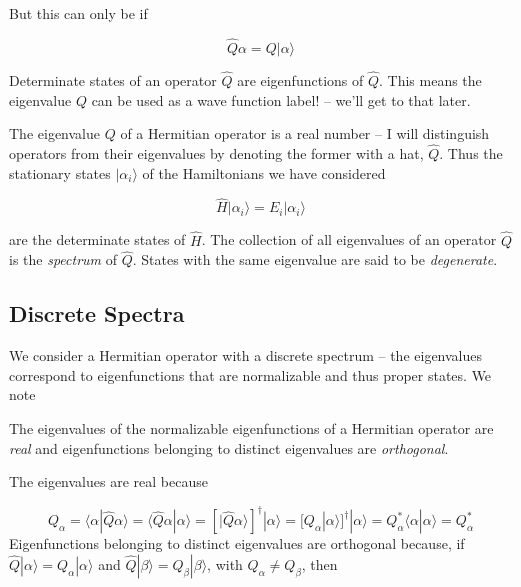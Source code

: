 But this can only be if 

\begin{mainbox}{}
  \[
  \hat{Q} \alpha = Q |\alpha\rangle
  \] \vspace{3px}
  
  Determinate states of an operator $\hat{Q}$ are eigenfunctions of $\hat{Q}$.
  This means the eigenvalue $Q$  can be used as a wave function label! -- we'll
  get to that later. 
\end{mainbox}

The eigenvalue $Q$ of a Hermitian operator is a real number -- I will
distinguish operators from their eigenvalues by denoting the former with
a hat, $\hat{Q}$. Thus the stationary states $|\alpha_i\rangle$ of the
Hamiltonians we have considered 

\[
\hat{H}|\alpha_i\rangle = E_i |\alpha_i\rangle
\] \vspace{3px}

are the determinate states of $\hat{H}$. The collection of all eigenvalues of
an operator $ \hat{Q}$ is the \textit{spectrum} of $\hat{Q}$. States with the
same eigenvalue are said to be \textit{degenerate}.


\subsection{Discrete Spectra}

We consider a Hermitian operator with a discrete spectrum -- the eigenvalues
correspond to eigenfunctions that are normalizable and thus proper states. We
note 

\begin{subbox}{}
  The eigenvalues of the normalizable eigenfunctions of a Hermitian operator
  are \textit{real} and eigenfunctions belonging to distinct eigenvalues are
  \textit{orthogonal}. 
\end{subbox}

The eigenvalues are real because 

\[
Q_\alpha = \langle \alpha | \hat{Q} \alpha \rangle = \langle \hat{Q}\alpha
| \alpha\rangle = \left[ | \hat{Q}\alpha \rangle \right]^\dagger |\alpha
\rangle = [Q_\alpha|\alpha\rangle]^\dagger |\alpha \rangle = Q_\alpha^* \langle
\alpha | \alpha \rangle = Q_\alpha^*
\] \vspace{3px}
Eigenfunctions belonging to distinct eigenvalues are orthogonal because, if
$\hat{Q}|\alpha\rangle = Q_\alpha |\alpha \rangle$ and $\hat{Q}|\beta\rangle
= Q_\beta |\beta\rangle$, with $Q_\alpha \neq Q_\beta$, then 

